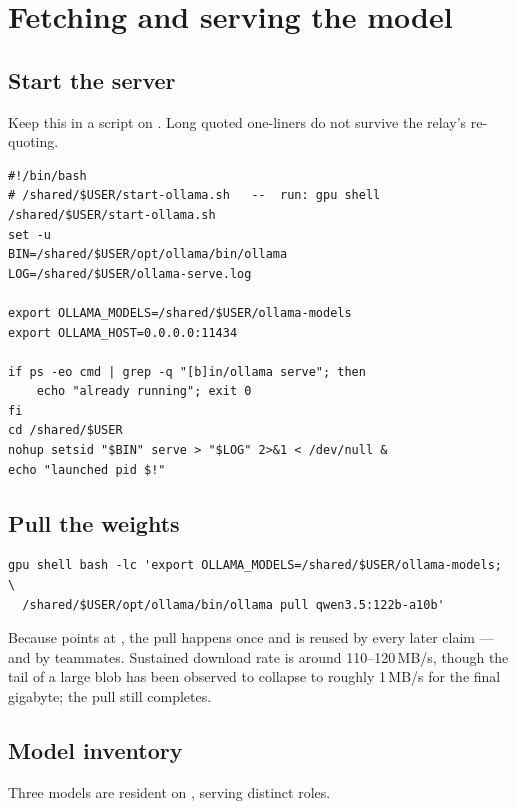 \section{Fetching and serving the model}
\label{sec:serving}

\subsection{Start the server}
Keep this in a script on . Long quoted one-liners do not survive
the relay's re-quoting.

\begin{lstlisting}
#!/bin/bash
# /shared/$USER/start-ollama.sh   --  run: gpu shell /shared/$USER/start-ollama.sh
set -u
BIN=/shared/$USER/opt/ollama/bin/ollama
LOG=/shared/$USER/ollama-serve.log

export OLLAMA_MODELS=/shared/$USER/ollama-models
export OLLAMA_HOST=0.0.0.0:11434

if ps -eo cmd | grep -q "[b]in/ollama serve"; then
    echo "already running"; exit 0
fi
cd /shared/$USER
nohup setsid "$BIN" serve > "$LOG" 2>&1 < /dev/null &
echo "launched pid $!"
\end{lstlisting}

\subsection{Pull the weights}

\begin{lstlisting}
gpu shell bash -lc 'export OLLAMA_MODELS=/shared/$USER/ollama-models; \
  /shared/$USER/opt/ollama/bin/ollama pull qwen3.5:122b-a10b'
\end{lstlisting}

Because  points at , the pull happens once and
is reused by every later claim --- and by teammates. Sustained download rate is
around 110--120\,MB/s, though the tail of a large blob has been observed to
collapse to roughly 1\,MB/s for the final gigabyte; the pull still completes.

\subsection{Model inventory}

Three models are resident on , serving distinct roles.

